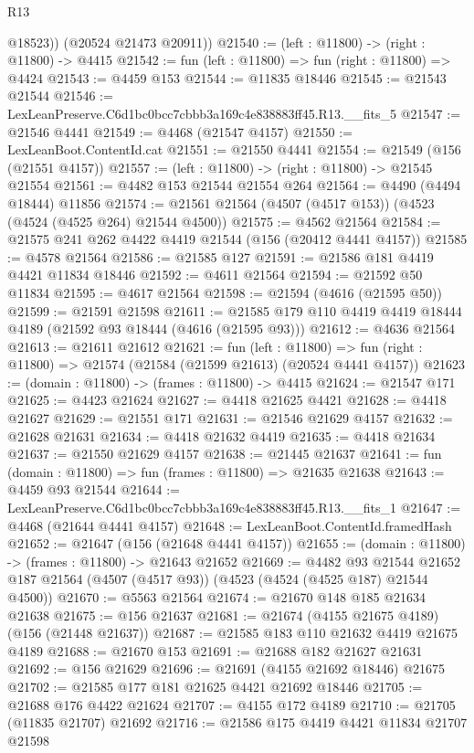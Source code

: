 \begin{lexlean}{R13}
\begin{coremodule}
          @18523))
      (@20524 @21473 @20911))
@21540 := (left : @11800) -> (right : @11800) -> @4415
@21542 := fun (left : @11800) => fun (right : @11800) => @4424
@21543 := @4459 @153
@21544 := @11835 @18446
@21545 := @21543 @21544
@21546 := LexLeanPreserve.C6d1bc0bcc7cbbb3a169c4e838883ff45.R13.__fits_5
@21547 := @21546 @4441
@21549 := @4468 (@21547 @4157)
@21550 := LexLeanBoot.ContentId.cat
@21551 := @21550 @4441
@21554 := @21549 (@156 (@21551 @4157))
@21557 := (left : @11800) -> (right : @11800) -> @21545 @21554
@21561 := @4482 @153 @21544 @21554 @264
@21564 := @4490 (@4494 @18444) @11856
@21574 := @21561 @21564 (@4507 (@4517 @153)) (@4523 (@4524 (@4525 @264) @21544 @4500))
@21575 := @4562 @21564
@21584 := @21575 @241 @262 @4422 @4419 @21544 (@156 (@20412 @4441 @4157))
@21585 := @4578 @21564
@21586 := @21585 @127
@21591 := @21586 @181 @4419 @4421 @11834 @18446
@21592 := @4611 @21564
@21594 := @21592 @50 @11834
@21595 := @4617 @21564
@21598 := @21594 (@4616 (@21595 @50))
@21599 := @21591 @21598
@21611 := @21585 @179 @110 @4419 @4419 @18444 @4189 (@21592 @93 @18444 (@4616 (@21595 @93)))
@21612 := @4636 @21564
@21613 := @21611 @21612
@21621 := fun (left : @11800) =>
  fun (right : @11800) => @21574 (@21584 (@21599 @21613) (@20524 @4441 @4157))
@21623 := (domain : @11800) -> (frames : @11800) -> @4415
@21624 := @21547 @171
@21625 := @4423 @21624
@21627 := @4418 @21625 @4421
@21628 := @4418 @21627
@21629 := @21551 @171
@21631 := @21546 @21629 @4157
@21632 := @21628 @21631
@21634 := @4418 @21632 @4419
@21635 := @4418 @21634
@21637 := @21550 @21629 @4157
@21638 := @21445 @21637
@21641 := fun (domain : @11800) => fun (frames : @11800) => @21635 @21638
@21643 := @4459 @93 @21544
@21644 := LexLeanPreserve.C6d1bc0bcc7cbbb3a169c4e838883ff45.R13.__fits_1
@21647 := @4468 (@21644 @4441 @4157)
@21648 := LexLeanBoot.ContentId.framedHash
@21652 := @21647 (@156 (@21648 @4441 @4157))
@21655 := (domain : @11800) -> (frames : @11800) -> @21643 @21652
@21669 := @4482
    @93
    @21544
    @21652
    @187
    @21564
    (@4507 (@4517 @93))
    (@4523 (@4524 (@4525 @187) @21544 @4500))
@21670 := @5563 @21564
@21674 := @21670 @148 @185 @21634 @21638
@21675 := @156 @21637
@21681 := @21674 (@4155 @21675 @4189) (@156 (@21448 @21637))
@21687 := @21585 @183 @110 @21632 @4419 @21675 @4189
@21688 := @21670 @153
@21691 := @21688 @182 @21627 @21631
@21692 := @156 @21629
@21696 := @21691 (@4155 @21692 @18446) @21675
@21702 := @21585 @177 @181 @21625 @4421 @21692 @18446
@21705 := @21688 @176 @4422 @21624
@21707 := @4155 @172 @4189
@21710 := @21705 (@11835 @21707) @21692
@21716 := @21586 @175 @4419 @4421 @11834 @21707 @21598

\end{coremodule}
\end{lexlean}
